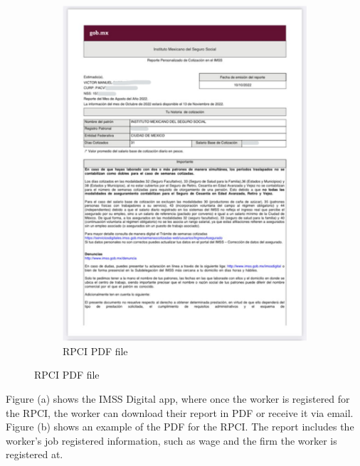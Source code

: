 \documentclass[10pt, oneside]{book}
\begin{document}
\begin{figure}[H]
\begin{center}
\begin{subfigure}{0.49\textwidth}
    \end{subfigure}
    \begin{subfigure}{0.49\textwidth}
    \caption{RPCI PDF file}
    \includegraphics[width=\textwidth]{04_Figures/rpci_app/rpci_3.png}
    \end{subfigure}
    

    \end{center}
\end{figure}
\scriptsize{
\noindent Figure (a) shows the IMSS Digital app, where once the worker is registered for the RPCI, the worker can download their report in PDF or receive it via email. Figure (b) shows an example of the PDF for the RPCI. The report includes the worker's job registered information, such as wage and the firm the worker is registered at.
} \\

\normalsize
\end{document}
